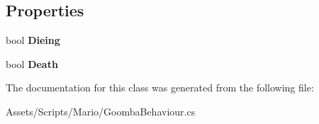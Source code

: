 \subsection*{Properties}
\begin{DoxyCompactItemize}
\item 
\hypertarget{class_goomba_behaviour_ac42c49b083b47a9ff4bc7981d1198faf}{bool {\bfseries Dieing}}\label{class_goomba_behaviour_ac42c49b083b47a9ff4bc7981d1198faf}

\item 
\hypertarget{class_goomba_behaviour_ae5355b5468a7622c622e49ef741c11cd}{bool {\bfseries Death}}\label{class_goomba_behaviour_ae5355b5468a7622c622e49ef741c11cd}

\end{DoxyCompactItemize}


The documentation for this class was generated from the following file\-:\begin{DoxyCompactItemize}
\item 
Assets/\-Scripts/\-Mario/Goomba\-Behaviour.\-cs\end{DoxyCompactItemize}
